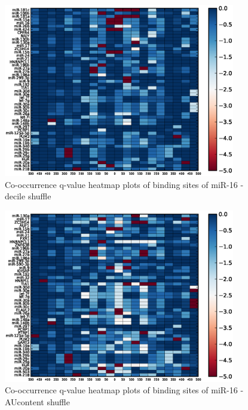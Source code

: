 \begin{figure}
   	\includegraphics[width=0.9\textwidth,clip]{appendix1/figures/miR-16_decile_expressed_heatmap_qvalues0.eps}
   	\caption{Co-occurrence q-value heatmap plots of binding sites of miR-16 - decile shuffle}
\end{figure}
\clearpage
\begin{figure}
   	\includegraphics[width=0.9\textwidth,clip]{appendix1/figures/miR-16_AUcontent_expressed_heatmap_qvalues0.eps}
   	\caption{Co-occurrence q-value heatmap plots of binding sites of miR-16 - AUcontent shuffle}
\end{figure}

